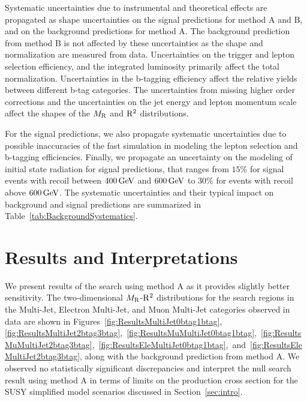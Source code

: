 Systematic uncertainties due to instrumental and theoretical effects are propagated as shape 
uncertainties on the signal predictions for method A and B, and on the background
predictions for method A. The background prediction from method B is not affected
by these uncertainties as the shape and normalization are measured from data.
Uncertainties on the trigger and lepton selection efficiency, and the 
integrated luminosity primarily affect the total normalization. Uncertainties in 
the b-tagging efficiency affect the relative yields between different b-tag categories. 
The uncertainties from missing higher order corrections and the uncertainties on the jet 
energy and lepton momentum scale affect the shapes of the $M_\mathrm{R}$ and $\mathrm{R}^2$ distributions.

For the signal predictions, we also propagate systematic uncertainties due to
possible inaccuracies of the fast simulation in modeling the lepton selection and 
b-tagging efficiencies. Finally, we propagate an uncertainty on the modeling of initial 
state radiation for signal predictions, that ranges from $15\%$ for signal events with 
recoil between $400\,\text{Ge\hspace{-.08em}V}$ and $600\,\text{Ge\hspace{-.08em}V}$ to $30\%$ for events with recoil above $600\,\text{Ge\hspace{-.08em}V}$. 
The systematic uncertainties and their typical impact on background and signal
predictions are summarized in Table~\ref{tab:BackgroundSystematics}.



\section{Results and Interpretations}
\label{sec:Results}

We present results of the search using method A as it provides slightly better sensitivity.
The two-dimensional $M_\mathrm{R}$-$\mathrm{R}^2$ distributions for the search regions in the 
Multi-Jet, Electron Multi-Jet, and Muon Multi-Jet categories observed in data are shown in 
Figures~\ref{fig:ResultsMultiJet0btag1btag},\ref{fig:ResultsMultiJet2btag3btag},~\ref{fig:ResultsMuMultiJet0btag1btag},~\ref{fig:ResultsMuMultiJet2btag3btag},~\ref{fig:ResultsEleMultiJet0btag1btag},~and~\ref{fig:ResultsEleMultiJet2btag3btag},
along with the background prediction from method A. 
We observed no statistically significant discrepancies and interpret the null search
result using method A in terms of limits on the production cross section for the SUSY 
simplified model scenarios discussed in Section~\ref{sec:intro}.

